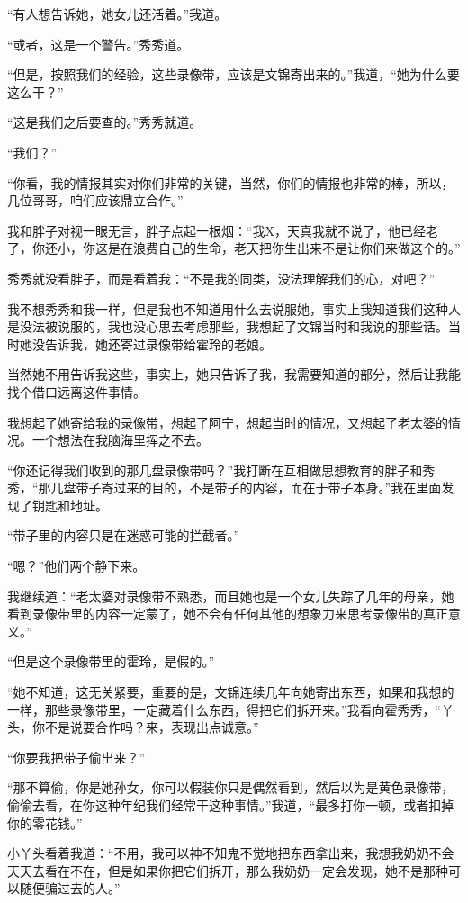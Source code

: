 “有人想告诉她，她女儿还活着。”我道。

“或者，这是一个警告。”秀秀道。

“但是，按照我们的经验，这些录像带，应该是文锦寄出来的。”我道，“她为什么要这么干？”

“这是我们之后要查的。”秀秀就道。

“我们？”

“你看，我的情报其实对你们非常的关键，当然，你们的情报也非常的棒，所以，几位哥哥，咱们应该鼎立合作。”

我和胖子对视一眼无言，胖子点起一根烟：“我X，天真我就不说了，他已经老了，你还小，你这是在浪费自己的生命，老天把你生出来不是让你们来做这个的。”

秀秀就没看胖子，而是看着我：“不是我的同类，没法理解我们的心，对吧？”

我不想秀秀和我一样，但是我也不知道用什么去说服她，事实上我知道我们这种人是没法被说服的，我也没心思去考虑那些，我想起了文锦当时和我说的那些话。当时她没告诉我，她还寄过录像带给霍玲的老娘。

当然她不用告诉我这些，事实上，她只告诉了我，我需要知道的部分，然后让我能找个借口远离这件事情。

我想起了她寄给我的录像带，想起了阿宁，想起当时的情况，又想起了老太婆的情况。一个想法在我脑海里挥之不去。

“你还记得我们收到的那几盘录像带吗？”我打断在互相做思想教育的胖子和秀秀，“那几盘带子寄过来的目的，不是带子的内容，而在于带子本身。”我在里面发现了钥匙和地址。

“带子里的内容只是在迷惑可能的拦截者。”

“嗯？”他们两个静下来。

我继续道：“老太婆对录像带不熟悉，而且她也是一个女儿失踪了几年的母亲，她看到录像带里的内容一定蒙了，她不会有任何其他的想象力来思考录像带的真正意义。”

“但是这个录像带里的霍玲，是假的。”

“她不知道，这无关紧要，重要的是，文锦连续几年向她寄出东西，如果和我想的一样，那些录像带里，一定藏着什么东西，得把它们拆开来。”我看向霍秀秀，“丫头，你不是说要合作吗？来，表现出点诚意。”

“你要我把带子偷出来？”

“那不算偷，你是她孙女，你可以假装你只是偶然看到，然后以为是黄色录像带，偷偷去看，在你这种年纪我们经常干这种事情。”我道，“最多打你一顿，或者扣掉你的零花钱。”

小丫头看着我道：“不用，我可以神不知鬼不觉地把东西拿出来，我想我奶奶不会天天去看在不在，但是如果你把它们拆开，那么我奶奶一定会发现，她不是那种可以随便骗过去的人。”

